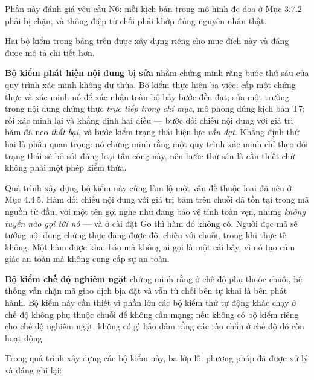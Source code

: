 Phần này đánh giá yêu cầu N6: mỗi kịch bản trong mô hình đe dọa ở Mục 3.7.2 phải bị chặn, và thông điệp từ chối phải khớp đúng nguyên nhân thật.



Hai bộ kiểm trong bảng trên được xây dựng riêng cho mục đích này và đáng được mô tả chi tiết hơn.

\textbf{Bộ kiểm phát hiện nội dung bị sửa} nhằm chứng minh rằng bước thứ sáu của quy trình xác minh không dư thừa. Bộ kiểm thực hiện ba việc: cấp một chứng thực và xác minh nó để xác nhận toàn bộ bảy bước đều đạt; sửa một trường trong nội dung chứng thực \emph{trực tiếp trong chỉ mục}, mô phỏng đúng kịch bản T7; rồi xác minh lại và khẳng định hai điều --- bước đối chiếu nội dung với giá trị băm đã neo \emph{thất bại}, và bước kiểm trạng thái hiệu lực \emph{vẫn đạt}. Khẳng định thứ hai là phần quan trọng: nó chứng minh rằng một quy trình xác minh chỉ theo dõi trạng thái sẽ bỏ sót đúng loại tấn công này, nên bước thứ sáu là cần thiết chứ không phải một phép kiểm thừa.

Quá trình xây dựng bộ kiểm này cũng làm lộ một vấn đề thuộc loại đã nêu ở Mục 4.4.5. Hàm đối chiếu nội dung với giá trị băm trên chuỗi đã tồn tại trong mã nguồn từ đầu, với một tên gọi nghe như đang bảo vệ tính toàn vẹn, nhưng \emph{không tuyến nào gọi tới nó} --- và ở cài đặt Go thì hàm đó không có. Người đọc mã sẽ tưởng nội dung chứng thực đang được đối chiếu với chuỗi, trong khi thực tế không. Một hàm được khai báo mà không ai gọi là một cái bẫy, vì nó tạo cảm giác an toàn mà không cung cấp sự an toàn.

\textbf{Bộ kiểm chế độ nghiêm ngặt} chứng minh rằng ở chế độ phụ thuộc chuỗi, hệ thống vẫn chặn mã giao dịch bịa đặt và vẫn từ chối bên tự khai là bên phát hành. Bộ kiểm này cần thiết vì phần lớn các bộ kiểm thử tự động khác chạy ở chế độ không phụ thuộc chuỗi để không cần mạng; nếu không có bộ kiểm riêng cho chế độ nghiêm ngặt, không có gì bảo đảm rằng các rào chắn ở chế độ đó còn hoạt động.

Trong quá trình xây dựng các bộ kiểm này, ba lớp lỗi phương pháp đã được xử lý và đáng ghi lại:

